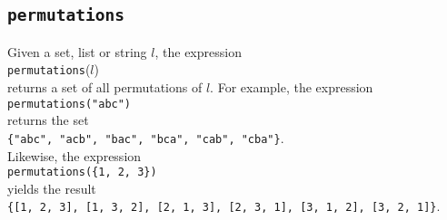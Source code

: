 \subsection{\texttt{permutations}}
Given a set, list or string $l$, the expression
\\[0.2cm]
\hspace*{1.3cm}
\texttt{permutations}($l$)
\\[0.2cm]
returns a set of all permutations of $l$.  For example, the expression
\\[0.2cm]
\hspace*{1.3cm}
\texttt{permutations("abc")}
\\[0.2cm]
returns the set
\\[0.2cm]
\hspace*{1.3cm}
\texttt{\{"abc", "acb", "bac", "bca", "cab", "cba"\}}.
\\[0.2cm]
Likewise, the expression
\\[0.2cm]
\hspace*{1.3cm}
\texttt{permutations(\{1, 2, 3\})}
\\[0.2cm]
yields the result
\\[0.2cm]
\hspace*{1.3cm}
\texttt{\{[1, 2, 3], [1, 3, 2], [2, 1, 3], [2, 3, 1], [3, 1, 2], [3, 2, 1]\}}.

